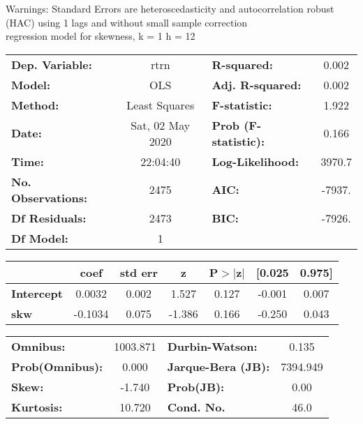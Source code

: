 Warnings: \newline
 [1] Standard Errors are heteroscedasticity and autocorrelation robust (HAC) using 1 lags and without small sample correction\\ 

regression model for skewness, k = 1 h = 12\begin{center}
\begin{tabular}{lclc}
\toprule
\textbf{Dep. Variable:}    &       rtrn       & \textbf{  R-squared:         } &     0.002   \\
\textbf{Model:}            &       OLS        & \textbf{  Adj. R-squared:    } &     0.002   \\
\textbf{Method:}           &  Least Squares   & \textbf{  F-statistic:       } &     1.922   \\
\textbf{Date:}             & Sat, 02 May 2020 & \textbf{  Prob (F-statistic):} &    0.166    \\
\textbf{Time:}             &     22:04:40     & \textbf{  Log-Likelihood:    } &    3970.7   \\
\textbf{No. Observations:} &        2475      & \textbf{  AIC:               } &    -7937.   \\
\textbf{Df Residuals:}     &        2473      & \textbf{  BIC:               } &    -7926.   \\
\textbf{Df Model:}         &           1      & \textbf{                     } &             \\
\bottomrule
\end{tabular}
\begin{tabular}{lcccccc}
                   & \textbf{coef} & \textbf{std err} & \textbf{z} & \textbf{P$> |$z$|$} & \textbf{[0.025} & \textbf{0.975]}  \\
\midrule
\textbf{Intercept} &       0.0032  &        0.002     &     1.527  &         0.127        &       -0.001    &        0.007     \\
\textbf{skw}       &      -0.1034  &        0.075     &    -1.386  &         0.166        &       -0.250    &        0.043     \\
\bottomrule
\end{tabular}
\begin{tabular}{lclc}
\textbf{Omnibus:}       & 1003.871 & \textbf{  Durbin-Watson:     } &    0.135  \\
\textbf{Prob(Omnibus):} &   0.000  & \textbf{  Jarque-Bera (JB):  } & 7394.949  \\
\textbf{Skew:}          &  -1.740  & \textbf{  Prob(JB):          } &     0.00  \\
\textbf{Kurtosis:}      &  10.720  & \textbf{  Cond. No.          } &     46.0  \\
\bottomrule
\end{tabular}
\end{center}

